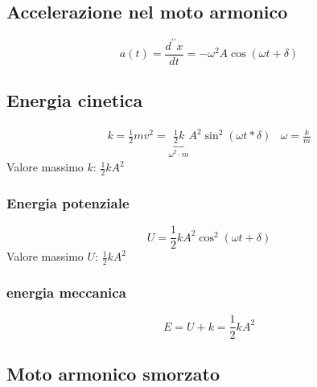 \documentclass{book}
\begin{document}
\subsection{Accelerazione nel moto armonico}
\label{sec:accnelmotarm}

\begin{equation}
  \label{eq:accnelmotarm}
  a(t)=\frac{d^{\prime\prime}x}{dt}=-\omega^2 A\cos (\omega t +\delta)
\end{equation}

\subsection{Energia cinetica}
\label{sec:encin}

\begin{equation}
  \label{eq:encin}
  \begin{matrix}
    k=\frac{1}{2}mv^2=\underbrace{\frac{1}{2}k}_{\omega^2\cdot m}A^2\sin^2(\omega t*\delta) & \omega=\frac{k}{m}
  \end{matrix}
\end{equation}
Valore massimo $k$: $\frac{1}{2}kA^2$
\begin{multicols}{2}
  \subsubsection{Energia potenziale}
  \label{sec:enpotmotoarm}
  \begin{equation*}
    U=\frac{1}{2}kA^2\cos^2(\omega t +\delta)
  \end{equation*}
  Valore massimo $U$: $\frac{1}{2}kA^2$
  
  \subsubsection{energia meccanica}
  \label{sec:enmecmotoarm}
  \begin{equation*}
    E=U+k=\frac{1}{2}kA^2
  \end{equation*}
\end{multicols}

\subsection{Moto armonico smorzato}
\label{sec:motarmsmorz}
\end{document}
